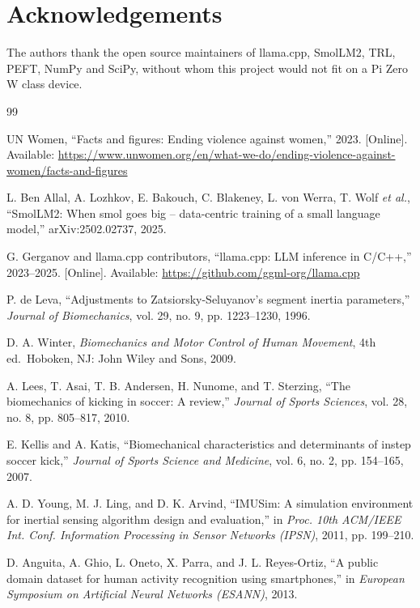 \documentclass[conference]{IEEEtran}
\begin{document}
\section*{Acknowledgements}
The authors thank the open source maintainers of llama.cpp, SmolLM2, TRL, PEFT, NumPy and SciPy, without whom this project would not fit on a Pi Zero W class device.

\begin{thebibliography}{99}

UN Women, ``Facts and figures: Ending violence against women,'' 2023. [Online]. Available: \url{https://www.unwomen.org/en/what-we-do/ending-violence-against-women/facts-and-figures}

L. Ben Allal, A. Lozhkov, E. Bakouch, C. Blakeney, L. von Werra, T. Wolf \emph{et al.}, ``SmolLM2: When smol goes big -- data-centric training of a small language model,'' arXiv:2502.02737, 2025.

G. Gerganov and llama.cpp contributors, ``llama.cpp: LLM inference in C/C++,'' 2023--2025. [Online]. Available: \url{https://github.com/ggml-org/llama.cpp}

P. de Leva, ``Adjustments to Zatsiorsky-Seluyanov's segment inertia parameters,'' \emph{Journal of Biomechanics}, vol. 29, no. 9, pp. 1223--1230, 1996.

D. A. Winter, \emph{Biomechanics and Motor Control of Human Movement}, 4th ed.\ Hoboken, NJ: John Wiley and Sons, 2009.

A. Lees, T. Asai, T. B. Andersen, H. Nunome, and T. Sterzing, ``The biomechanics of kicking in soccer: A review,'' \emph{Journal of Sports Sciences}, vol. 28, no. 8, pp. 805--817, 2010.

E. Kellis and A. Katis, ``Biomechanical characteristics and determinants of instep soccer kick,'' \emph{Journal of Sports Science and Medicine}, vol. 6, no. 2, pp. 154--165, 2007.

A. D. Young, M. J. Ling, and D. K. Arvind, ``IMUSim: A simulation environment for inertial sensing algorithm design and evaluation,'' in \emph{Proc. 10th ACM/IEEE Int. Conf. Information Processing in Sensor Networks (IPSN)}, 2011, pp. 199--210.

D. Anguita, A. Ghio, L. Oneto, X. Parra, and J. L. Reyes-Ortiz, ``A public domain dataset for human activity recognition using smartphones,'' in \emph{European Symposium on Artificial Neural Networks (ESANN)}, 2013.


\end{thebibliography}
\end{document}
